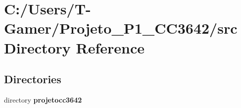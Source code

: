 \section{C\+:/\+Users/\+T-\/\+Gamer/\+Projeto\+\_\+\+P1\+\_\+\+C\+C3642/src Directory Reference}
\label{dir_68267d1309a1af8e8297ef4c3efbcdba}
\subsection*{Directories}
\begin{DoxyCompactItemize}
\item 
directory \textbf{ projetocc3642}
\end{DoxyCompactItemize}
